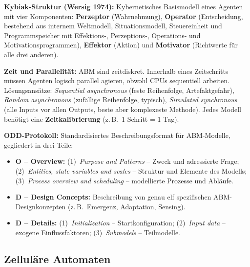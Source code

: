 \textbf{Kybiak-Struktur (Wersig 1974):} Kybernetisches Basismodell eines Agenten mit vier Komponenten: \textbf{Perzeptor} (Wahrnehmung), \textbf{Operator} (Entscheidung, bestehend aus internem Weltmodell, Situationsmodell, Steuereinheit und Programmspeicher mit Effektions-, Perzeptions-, Operations- und Motivationsprogrammen), \textbf{Effektor} (Aktion) und \textbf{Motivator} (Richtwerte für alle drei anderen).

\textbf{Zeit und Parallelität:} ABM sind zeitdiskret. Innerhalb eines Zeitschritts müssen Agenten logisch parallel agieren, obwohl CPUs sequentiell arbeiten. Lösungsansätze: \textit{Sequential asynchronous} (feste Reihenfolge, Artefaktgefahr), \textit{Random asynchronous} (zufällige Reihenfolge, typisch), \textit{Simulated synchronous} (alle Inputs vor allen Outputs, beste aber komplexeste Methode). Jedes Modell benötigt eine \textbf{Zeitkalibrierung} (z.\,B.\ 1 Schritt = 1 Tag).

\textbf{ODD-Protokoll:} Standardisiertes Beschreibungsformat für ABM-Modelle, gegliedert in drei Teile:
\begin{itemize}[leftmargin=1.5em]
    \item \textbf{O -- Overview:} (1)~\textit{Purpose and Patterns} -- Zweck und adressierte Frage; (2)~\textit{Entities, state variables and scales} -- Struktur und Elemente des Modells; (3)~\textit{Process overview and scheduling} -- modellierte Prozesse und Abläufe.
    \item \textbf{D -- Design Concepts:} Beschreibung von genau elf spezifischen ABM-Designkonzepten (z.\,B.\ Emergenz, Adaptation, Sensing).
    \item \textbf{D -- Details:} (1)~\textit{Initialization} -- Startkonfiguration; (2)~\textit{Input data} -- exogene Einflussfaktoren; (3)~\textit{Submodels} -- Teilmodelle.
\end{itemize}

\newpage

\subsection{Zelluläre Automaten}


